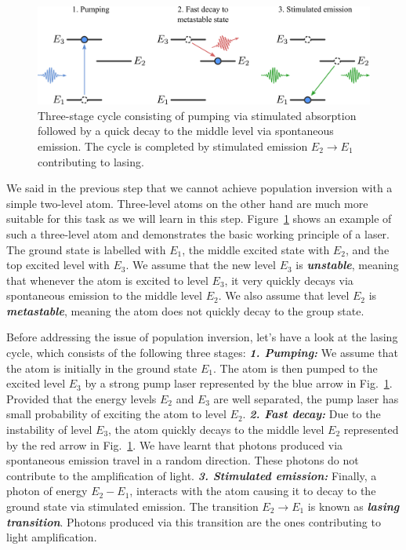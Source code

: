 \begin{figure}[t]
    \centering
    \includegraphics[width=\textwidth]{lesson5/5-4_three-level-atom.pdf}
    \caption[Laser cycle]{Three-stage cycle consisting of pumping via stimulated absorption followed by a quick decay to the middle level via spontaneous emission. The cycle is completed by stimulated emission $E_2 \rightarrow E_1$ contributing to lasing.}
    \label{fig:5-4_three_level_atom}
\end{figure}

We said in the previous step that we cannot achieve population inversion with a simple two-level atom.
Three-level atoms on the other hand are much more suitable for this task as we will learn in this step.
Figure~\ref{fig:5-4_three_level_atom} shows an example of such a three-level atom and demonstrates the basic working principle of a laser.
The ground state is labelled with $E_1$, the middle excited state with $E_2$, and the top excited level with $E_3$.
We assume that the new level $E_3$ is \textit{\textbf{unstable}}, meaning that whenever the atom is excited to level $E_3$, it very quickly decays via spontaneous emission to the middle level $E_2$.
We also assume that level $E_2$ is \textit{\textbf{metastable}}, meaning the atom does not quickly decay to the group state.

Before addressing the issue of population inversion, let's have a look at the lasing cycle, which consists of the following three stages:
\newline
\textit{\textbf{1. Pumping:}}
We assume that the atom is initially in the ground state $E_1$.
The atom is then pumped to the excited level $E_3$ by a strong pump laser represented by the blue arrow in Fig.~\ref{fig:5-4_three_level_atom}.
Provided that the energy levels $E_2$ and $E_3$ are well separated, the pump laser has small probability of exciting the atom to level $E_2$.
\newline
\textit{\textbf{2. Fast decay:}}
Due to the instability of level $E_3$, the atom quickly decays to the middle level $E_2$ represented by the red arrow in Fig.~\ref{fig:5-4_three_level_atom}.
We have learnt that photons produced via spontaneous emission travel in a random direction.
These photons do not contribute to the amplification of light.
\newline
\textit{\textbf{3. Stimulated emission:}}
Finally, a photon of energy $E_2-E_1$, interacts with the atom causing it to decay to the ground state via stimulated emission.
The transition $E_2\rightarrow E_1$ is known as \textit{\textbf{lasing transition}}.
Photons produced via this transition are the ones contributing to light amplification.

